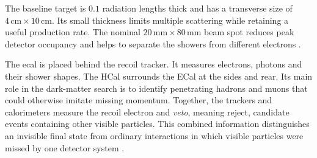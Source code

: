 The baseline target is \(0.1\) radiation lengths thick and has a transverse
size of \(4\,\mathrm{cm}\times10\,\mathrm{cm}\). Its small thickness limits
multiple scattering while retaining a useful production rate. The nominal
\(20\,\mathrm{mm}\times80\,\mathrm{mm}\) beam spot reduces peak detector
occupancy and helps to separate the showers from different electrons
\cite{ldmx2025-overview}.

The \gls{ecal} is placed behind the recoil tracker. It measures electrons,
photons and their shower shapes. The HCal surrounds the ECal at the sides
and rear. Its main role in the dark-matter search is to identify penetrating
hadrons and muons that could otherwise imitate missing momentum. Together,
the trackers and calorimeters measure the recoil electron and \emph{veto},
meaning reject, candidate events containing other visible particles. This
combined information distinguishes an invisible final state from ordinary
interactions in which visible particles were missed by one detector system
\cite{ldmx2025-overview}.


